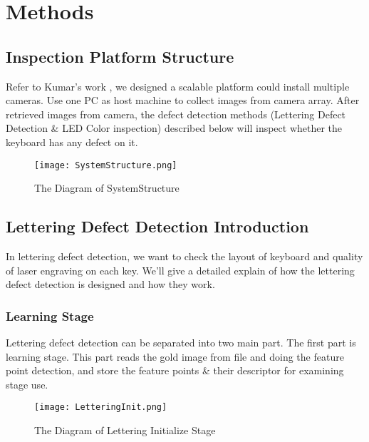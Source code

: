 \chapter{Methods}
\label{c:methods}

\section{Inspection Platform Structure}
Refer to Kumar's work \cite{kumar2008computer}, we designed a scalable platform could install multiple cameras. Use one PC as host machine to collect images from camera array.
After retrieved images from camera, the defect detection methods (Lettering Defect Detection \& LED Color inspection) described below will inspect whether the keyboard has any defect on it. 
\begin{figure}
	\texttt{[image: SystemStructure.png]}
	\caption{The Diagram of SystemStructure}
	\label{fig:SystemStructure}
\end{figure}


\section{Lettering Defect Detection Introduction}
\label{letteringDetection}
	In lettering defect detection, we want to check the layout of keyboard and quality of laser engraving on each key.
	We'll give a detailed explain of how the lettering defect detection is designed and how they work.

	\subsection{Learning Stage} 
		Lettering defect detection can be separated into two main part.
		The first part is learning stage. This part reads the gold image from file and doing the feature point detection, and store the feature points \& their descriptor for examining stage use.

		\begin{figure}
			\texttt{[image: LetteringInit.png]}
			\caption{The Diagram of Lettering Initialize Stage}
			\label{fig:LetteringInit}
		\end{figure}

